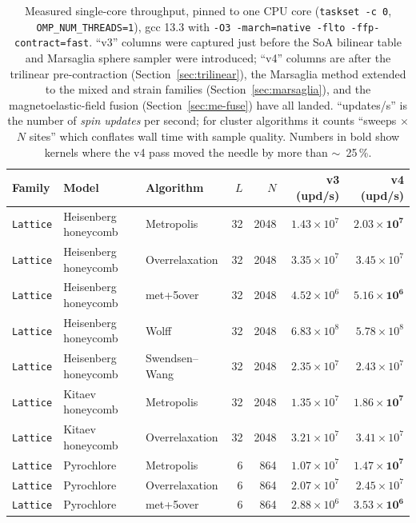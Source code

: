 \documentclass[11pt,letterpaper]{article}
\begin{document}
\begin{table}[t]
\centering
\caption{Measured single-core throughput, pinned to one CPU core
(\texttt{taskset -c 0}, \texttt{OMP\_NUM\_THREADS=1}), gcc 13.3 with
\texttt{-O3 -march=native -flto -ffp-contract=fast}.  ``v3'' columns
were captured just before the SoA bilinear table and Marsaglia sphere
sampler were introduced; ``v4'' columns are after the trilinear
pre-contraction (Section~\ref{sec:trilinear}), the Marsaglia method
extended to the mixed and strain families (Section~\ref{sec:marsaglia}),
and the magnetoelastic-field fusion
(Section~\ref{sec:me-fuse}) have all landed.  ``updates/s'' is the
number of \emph{spin updates} per second; for cluster algorithms it
counts ``sweeps $\times$ $N$ sites'' which conflates wall time with
sample quality.  Numbers in bold show kernels where the v4 pass moved
the needle by more than $\sim$~25\,\%.}
\label{tab:bench}
\begin{tabular}{lllrrrr}
\toprule
Family & Model & Algorithm & $L$ & $N$ & v3 (upd/s) & v4 (upd/s) \\
\midrule
\texttt{Lattice} & Heisenberg honeycomb & Metropolis     & 32 & 2048  & $1.43{\times}10^{7}$ & $\mathbf{2.03{\times}10^{7}}$ \\
\texttt{Lattice} & Heisenberg honeycomb & Overrelaxation & 32 & 2048  & $3.35{\times}10^{7}$ & $3.45{\times}10^{7}$ \\
\texttt{Lattice} & Heisenberg honeycomb & met+5over      & 32 & 2048  & $4.52{\times}10^{6}$ & $\mathbf{5.16{\times}10^{6}}$ \\
\texttt{Lattice} & Heisenberg honeycomb & Wolff          & 32 & 2048  & $6.83{\times}10^{8}$ & $5.78{\times}10^{8}$ \\
\texttt{Lattice} & Heisenberg honeycomb & Swendsen--Wang & 32 & 2048  & $2.35{\times}10^{7}$ & $2.43{\times}10^{7}$ \\
\texttt{Lattice} & Kitaev honeycomb     & Metropolis     & 32 & 2048  & $1.35{\times}10^{7}$ & $\mathbf{1.86{\times}10^{7}}$ \\
\texttt{Lattice} & Kitaev honeycomb     & Overrelaxation & 32 & 2048  & $3.21{\times}10^{7}$ & $3.41{\times}10^{7}$ \\
\texttt{Lattice} & Pyrochlore           & Metropolis     & 6  & 864   & $1.07{\times}10^{7}$ & $\mathbf{1.47{\times}10^{7}}$ \\
\texttt{Lattice} & Pyrochlore           & Overrelaxation & 6  & 864   & $2.07{\times}10^{7}$ & $2.45{\times}10^{7}$ \\
\texttt{Lattice} & Pyrochlore           & met+5over      & 6  & 864   & $2.88{\times}10^{6}$ & $\mathbf{3.53{\times}10^{6}}$ \\

\end{tabular}
\end{table}
\end{document}
